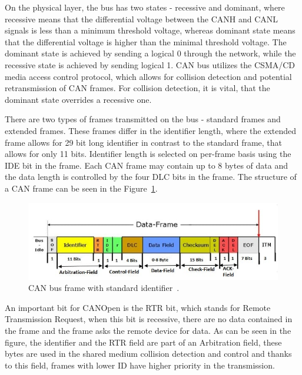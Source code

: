 On the physical layer, the bus has two states - recessive and dominant, where recessive means that the differential voltage between the CANH and CANL signals is less than a minimum threshold voltage, whereas dominant state means that the differential voltage is higher than the minimal threshold voltage\cite{st_michael_introduction_2019}.
The dominant state is achieved by sending a logical 0 through the network, while the recessive state is achieved by sending logical 1.
CAN bus utilizes the CSMA/CD media access control protocol, which allows for collision detection and potential retransmission of CAN frames.
For collision detection, it is vital, that the dominant state overrides a recessive one.

There are two types of frames transmitted on the bus - standard frames and extended frames.
These frames differ in the identifier length, where the extended frame allows for 29 bit long identifier in contrast to the standard frame, that allows for only 11 bits.
Identifier length is selected on per-frame basis using the IDE bit in the frame.
Each CAN frame may contain up to 8 bytes of data and the data length is controlled by the four DLC bits in the frame.
The structure of a CAN frame can be seen in the Figure~\ref{fig:can_frame}.

\begin{figure}[H]
    \centering
    \includegraphics[width=\textwidth]{obrazky/can_frame}
    \caption{CAN bus frame with standard identifier~\cite{piembsystech_can_nodate}.}
    \label{fig:can_frame}
\end{figure}

An important bit for CANOpen is the RTR bit, which stands for Remote Transmission Request, when this bit is recessive, there are no data contained in the frame and the frame asks the remote device for data.
As can be seen in the figure, the identifier and the RTR field are part of an Arbitration field, these bytes are used in the shared medium collision detection and control and thanks to this field, frames with lower ID have higher priority in the transmission.

